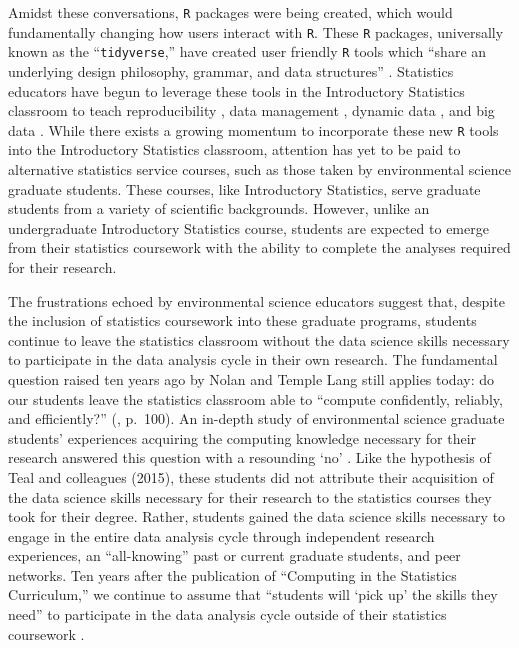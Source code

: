 \documentclass[12pt]{article}
\begin{document}
\quad Amidst these conversations, \texttt{R} packages were being created, which 
would fundamentally changing how users interact with \texttt{R}. These 
\texttt{R} packages, universally known as the ``\texttt{tidyverse},'' have 
created user friendly \texttt{R} tools which ``share an underlying design 
philosophy, grammar, and data structures'' \citep{tidyverse}. Statistics 
educators have begun to leverage these tools in the Introductory Statistics 
classroom to teach reproducibility \citep{mine-rmarkdown}, data management 
\citep{horton_takingachance}, dynamic data \citep{hardin-tise}, and big data
\citep{horton-tise}. While there exists a growing momentum to incorporate these
new \texttt{R} tools into the Introductory Statistics classroom, attention has 
yet to be paid to alternative statistics service courses, such as those taken 
by environmental science graduate students. These courses, like Introductory 
Statistics, serve graduate students from a variety of scientific backgrounds. 
However, unlike an undergraduate Introductory Statistics course, students are 
expected to emerge from their statistics coursework with the ability to 
complete the analyses required for their research. 

\quad The frustrations echoed by environmental science educators 
\citep{hampton, datacarpentry} suggest that, despite the inclusion of statistics 
coursework into these graduate programs, students continue to leave the 
statistics classroom without the data science skills necessary to participate in 
the data analysis cycle in their own research. The fundamental question raised 
ten years ago by Nolan and Temple Lang still applies today: do our students
leave the statistics classroom able to ``compute confidently, reliably, and
efficiently?'' (\citeyear{nolan}, p.\ 100). An in-depth study of environmental 
science graduate students' experiences acquiring the computing knowledge
necessary for their research answered this question with a resounding `no' 
\citep{theobold}. Like the hypothesis of Teal and colleagues (2015), these
students did not attribute their acquisition of the data science skills
necessary for their research to the statistics courses they took for their
degree. Rather, students gained the data science skills necessary to engage in
the entire data analysis cycle through independent research experiences, an
``all-knowing'' past or current graduate students, and peer networks. Ten years 
after the publication of ``Computing in the Statistics Curriculum,'' we continue
to assume that ``students will `pick up' the skills they need'' to participate 
in the data analysis cycle outside of their statistics coursework 
\citep[p.\ 309]{gould}. 
\end{document}

